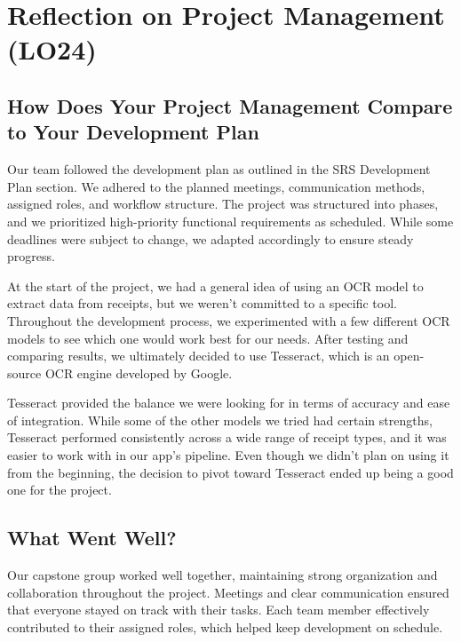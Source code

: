 \documentclass{article}
\begin{document}

\section{Reflection on Project Management (LO24)}

\subsection{How Does Your Project Management Compare to Your Development Plan}

Our team followed the development plan as outlined in the SRS Development Plan section.
We adhered to the planned meetings, communication methods, assigned roles, and workflow structure. 
The project was structured into phases, and we prioritized high-priority functional requirements as scheduled. 
While some deadlines were subject to change, we adapted accordingly to ensure steady progress.

At the start of the project, we had a general idea of using an OCR model to extract data from receipts, but we weren’t committed to a specific tool. 
Throughout the development process, we experimented with a few different OCR models to see which one would work best for our needs.
After testing and comparing results, we ultimately decided to use Tesseract, which is an open-source OCR engine developed by Google.

Tesseract provided the balance we were looking for in terms of accuracy and ease of integration. While some of the other models we tried had certain strengths, 
Tesseract performed consistently across a wide range of receipt types, and it was easier to work with in our app’s pipeline.
Even though we didn’t plan on using it from the beginning, the decision to pivot toward Tesseract ended up being a good one for the project.


\subsection{What Went Well?}

Our capstone group worked well together, maintaining strong organization and collaboration throughout the project.
Meetings and clear communication ensured that everyone stayed on track with their tasks.
Each team member effectively contributed to their assigned roles, which helped keep development on schedule.
\end{document}
